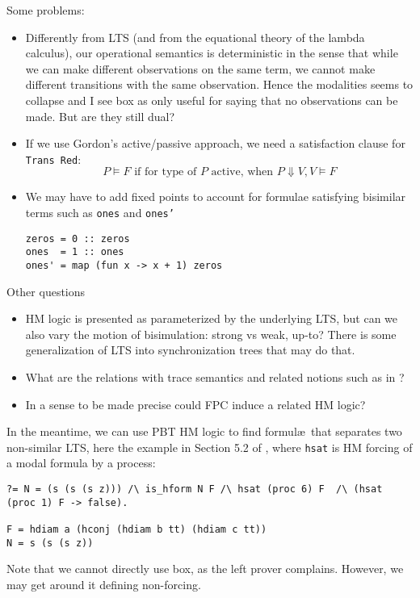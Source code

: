 \documentclass[sigconf]{acmart}
\begin{document}
Some problems:
\begin{itemize}
\item Differently from LTS (and from the equational theory of the lambda
  calculus), our operational semantics is deterministic in the sense
  that while we can make different observations on the same term, we
  cannot make different transitions with the same observation. Hence
  the modalities seems to collapse and I see box as only useful for saying that no observations can be made. But are they still dual?
\item If we use Gordon's active/passive approach, we need a satisfaction clause for \texttt{Trans  Red}:
  $$
  P \models F
  \mbox{ if for type of $P$ active, when } P\Downarrow V, V \models F
  $$
\item We may have to add fixed points to account for formulae satisfying bisimilar terms such as \texttt{ones} and \texttt{ones'}
\begin{lstlisting}
zeros = 0 :: zeros
ones  = 1 :: ones
ones' = map (fun x -> x + 1) zeros 
\end{lstlisting}
\end{itemize}

Other questions
\begin{itemize}
\item HM logic is presented as parameterized by
the underlying LTS, but can we also vary the motion of bisimulation:
strong vs weak, up-to? There is some generalization of LTS into synchronization trees that may do that.

\item  What are the relations with
trace semantics and related notions such as in
\cite{2007-Leroy-Grall}?

\item In a sense to be made precise could FPC
induce a related HM logic?
\end{itemize}
In the meantime, we can use PBT HM logic to find formul\ae\ that separates
two non-similar LTS, here the example in Section 5.2 of
\cite{HeathM15}, where \texttt{hsat} is HM forcing of a modal formula
by a process:
\begin{lstlisting}
?= N = (s (s (s z))) /\ is_hform N F /\ hsat (proc 6) F  /\ (hsat (proc 1) F -> false).

F = hdiam a (hconj (hdiam b tt) (hdiam c tt))
N = s (s (s z))
\end{lstlisting}
Note that we cannot directly use box, as the left prover
complains. However, we may get around it defining non-forcing.
\end{document}

